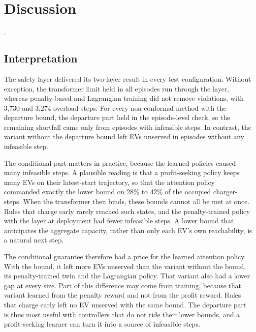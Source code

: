 \section{Discussion}\label{sec:discussion}

.

\subsection{Interpretation}\label{sec:interpretation}

The safety layer delivered its two-layer result in every test configuration.
Without exception, the transformer limit held in all episodes run through the layer, whereas penalty-based and Lagrangian training did not remove violations, with 3,730 and 3,274 overload steps.
For every non-conformal method with the departure bound, the departure part held in the episode-level check, so the remaining shortfall came only from episodes with infeasible steps.
In contrast, the variant without the departure bound left EVs unserved in episodes without any infeasible step.

The conditional part matters in practice, because the learned policies caused many infeasible steps.
A plausible reading is that a profit-seeking policy keeps many EVs on their latest-start trajectory, so that the attention policy commanded exactly the lower bound on 28\% to 42\% of the occupied charger-steps.
When the transformer then binds, these bounds cannot all be met at once.
Rules that charge early rarely reached such states, and the penalty-trained policy with the layer at deployment had fewer infeasible steps.
A lower bound that anticipates the aggregate capacity, rather than only each EV's own reachability, is a natural next step.

The conditional guarantee therefore had a price for the learned attention policy.
With the bound, it left more EVs unserved than the variant without the bound, its penalty-trained twin and the Lagrangian policy.
That variant also had a lower gap at every size.
Part of this difference may come from training, because that variant learned from the penalty reward and not from the profit reward.
Rules that charge early left no EV unserved with the same bound.
The departure part is thus most useful with controllers that do not ride their lower bounds, and a profit-seeking learner can turn it into a source of infeasible steps.

